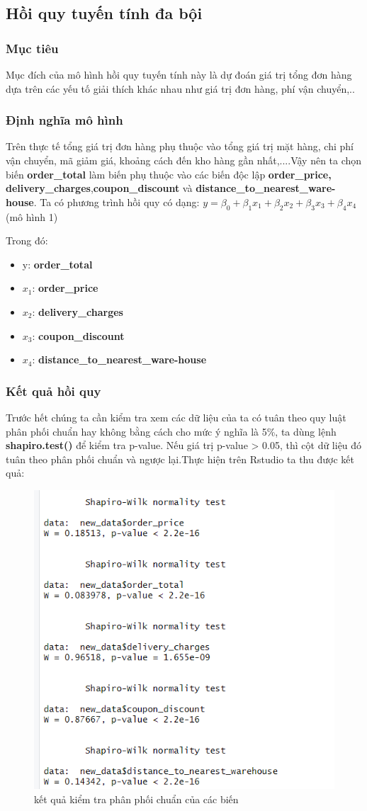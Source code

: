 \subsection{Hồi quy tuyến tính đa bội}
\subsubsection{Mục tiêu}

Mục đích của mô hình hồi quy tuyến tính này là dự đoán giá trị tổng đơn hàng dựa trên các yếu  tố giải thích khác nhau như giá trị đơn hàng, phí vận chuyển,..
\subsubsection{Định nghĩa mô hình}

Trên thực tế tổng giá trị đơn hàng phụ thuộc vào tổng giá trị mặt hàng, chi phí vận chuyển, mã giảm giá, khoảng cách đến kho hàng gần nhất,....Vậy nên ta chọn biến \textbf{order\_total} làm biến phụ thuộc vào các biến độc lập \textbf{order\_price, delivery\_charges},\textbf{coupon\_discount} và \textbf{distance\_to\_nearest\_ware-house}.
Ta có phương trình hồi quy có dạng: $y=\beta_0 + \beta_1x_1 + \beta_2x_2 + \beta_3x_3 + \beta_4x_4 $ (mô hình 1)

Trong đó:
\begin{itemize}
  \item y: \textbf{order\_total}
  \item $x_1$:  \textbf{order\_price}
  \item $x_2$:  \textbf{delivery\_charges}
  \item $x_3$:  \textbf{coupon\_discount}
  \item $x_4$:  \textbf{distance\_to\_nearest\_ware-house} 
\end{itemize}  

\subsubsection{Kết quả hồi quy}
Trước hết chúng ta cần kiểm tra xem các dữ liệu của ta có tuân theo quy luật phân phối chuẩn hay không bằng cách cho mức ý nghĩa là 5\%, ta dùng lệnh \textbf{shapiro.test()} để kiểm tra p-value. Nếu giá trị p-value > 0.05, thì cột dữ liệu đó tuân theo phân phối chuẩn và ngược lại.Thực hiện trên Rstudio ta thu được kết quả:

\begin{figure}[H]
  \centering
  \includegraphics[width=0.5\linewidth]{graphics/5.5.0.png}
  \caption{kết quả kiểm  tra phân phối chuẩn của các biến }
  \label{m1}
\end{figure}

